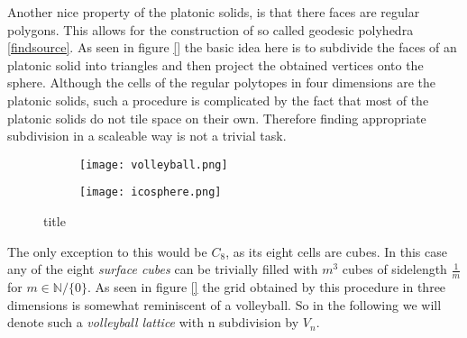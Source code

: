 Another nice property of the platonic solids, is that there faces are regular polygons. This allows for the construction of so called geodesic polyhedra \ref{findsource}. As seen in figure \ref{} the basic idea here is to subdivide the faces of an platonic solid into triangles and then project the obtained vertices onto the sphere. Although the cells of the regular polytopes in four dimensions are the platonic solids, such a procedure is complicated by the fact that most of the platonic solids do not tile space on their own. Therefore finding appropriate subdivision in a scaleable way is not a trivial task.\\

\begin{figure}
 \centering
 \begin{subfigure}{0.9\textwidth}
 \texttt{[image: volleyball.png]}
 \caption{}
 \label{fig:volleyPic}
 \end{subfigure}
 \begin{subfigure}{0.9\textwidth}
 \texttt{[image: icosphere.png]}
 \caption{}
 \label{fig:icospherePic}
 \end{subfigure}
 \caption{title}
\end{figure}

The only exception to this would be $C_8$, as its eight cells are cubes. In this case any of the eight \emph{surface cubes} can be trivially filled with $m^3$ cubes of sidelength $\frac{1}{m}$ for $m \in \mathbb{N}/\{0\}$. As seen in figure \ref{} the grid obtained by this procedure in three dimensions is somewhat reminiscent of a volleyball. So in the following we will denote such a \emph{volleyball lattice}  with n subdivision by $V_n$. \\

